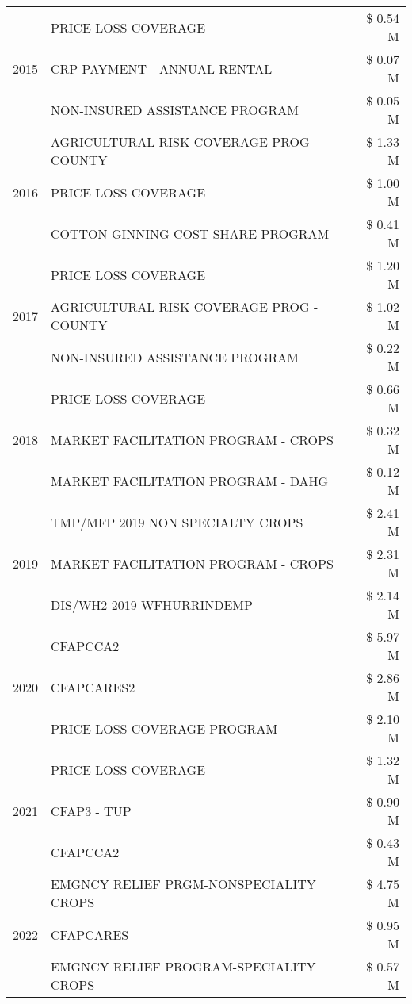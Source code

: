 \begin{tabular}{llr}
\cline{1-3}
\multirow[t]{3}{*}{2015} & PRICE LOSS COVERAGE & \$ 0.54 M \\
 & CRP PAYMENT - ANNUAL RENTAL & \$ 0.07 M \\
 & NON-INSURED ASSISTANCE PROGRAM & \$ 0.05 M \\
\cline{1-3}
\multirow[t]{3}{*}{2016} & AGRICULTURAL RISK COVERAGE PROG - COUNTY & \$ 1.33 M \\
 & PRICE LOSS COVERAGE & \$ 1.00 M \\
 & COTTON GINNING COST SHARE PROGRAM & \$ 0.41 M \\
\cline{1-3}
\multirow[t]{3}{*}{2017} & PRICE LOSS COVERAGE & \$ 1.20 M \\
 & AGRICULTURAL RISK COVERAGE PROG - COUNTY & \$ 1.02 M \\
 & NON-INSURED ASSISTANCE PROGRAM & \$ 0.22 M \\
\cline{1-3}
\multirow[t]{3}{*}{2018} & PRICE LOSS COVERAGE & \$ 0.66 M \\
 & MARKET FACILITATION PROGRAM - CROPS & \$ 0.32 M \\
 & MARKET FACILITATION PROGRAM - DAHG & \$ 0.12 M \\
\cline{1-3}
\multirow[t]{3}{*}{2019} & TMP/MFP 2019 NON SPECIALTY CROPS & \$ 2.41 M \\
 & MARKET FACILITATION PROGRAM - CROPS & \$ 2.31 M \\
 & DIS/WH2 2019 WFHURRINDEMP & \$ 2.14 M \\
\cline{1-3}
\multirow[t]{3}{*}{2020} & CFAPCCA2 & \$ 5.97 M \\
 & CFAPCARES2 & \$ 2.86 M \\
 & PRICE LOSS COVERAGE PROGRAM & \$ 2.10 M \\
\cline{1-3}
\multirow[t]{3}{*}{2021} & PRICE LOSS COVERAGE & \$ 1.32 M \\
 & CFAP3 - TUP & \$ 0.90 M \\
 & CFAPCCA2 & \$ 0.43 M \\
\cline{1-3}
\multirow[t]{3}{*}{2022} & EMGNCY RELIEF PRGM-NONSPECIALITY CROPS & \$ 4.75 M \\
 & CFAPCARES & \$ 0.95 M \\
 & EMGNCY RELIEF PROGRAM-SPECIALITY CROPS & \$ 0.57 M \\
\cline{1-3}
\bottomrule
\end{tabular}
